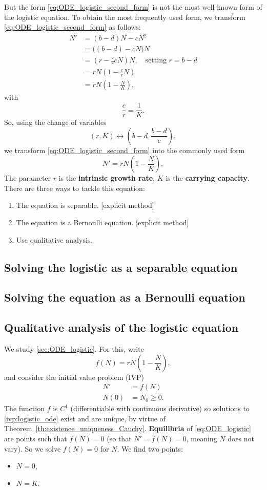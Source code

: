 But the form \eqref{eq:ODE_logistic_second_form} is not the most well known form of the logistic equation. To obtain the most frequently used form, we transform \eqref{eq:ODE_logistic_second_form} as follows:
\begin{align*}
N' &= (b-d)N-cN^2\\
&= \bigl((b-d)-cN\bigr)N \\
&= \left(r-\frac rr cN\right)N,\quad\textrm{setting }r=b-d \\
&= rN\left(1-\frac crN\right) \\
&= rN\left(1-\frac NK\right),
\end{align*}
with
\[
\frac cr=\frac 1K.
\]
So, using the change of variables 
\[
(r,K)\leftrightarrow\left(b-d,\frac{b-d}c\right),
\]
we transform \eqref{eq:ODE_logistic_second_form} into the commonly used form
\begin{equation}\label{eq:ODE_logistic}
N'=rN\left(1-\frac NK\right),
\end{equation}
The parameter $r$ is the \textbf{intrinsic growth rate}, $K$ is the \textbf{carrying capacity}.
There are three ways to tackle this equation:
\begin{enumerate}
\item The equation is separable. [explicit method]
\item The equation is a Bernoulli equation. [explicit method]
\item Use qualitative analysis.
\end{enumerate}

\subsection{Solving the logistic as a separable equation}
\subsection{Solving the equation as a Bernoulli equation}

\subsection{Qualitative analysis of the logistic equation}
We study \eqref{sec:ODE_logistic}.
For this, write
\[
f(N)=rN\left(1-\frac NK\right),
\]
and consider the initial value problem (IVP) 
\begin{equation}\label{ivp:logistic_ode}
\begin{aligned}
N' &= f(N)\\
N(0) &= N_0\geq 0.
\end{aligned}
\end{equation}
The function $f$ is $C^1$ (differentiable with continuous derivative) so solutions to \eqref{ivp:logistic_ode} exist and are unique, by virtue of Theorem~\ref{th:existence_uniqueness_Cauchy}.
\textbf{Equilibria} of \eqref{eq:ODE_logistic} are points such that $f(N)=0$ (so that $N'=f(N)=0$, meaning $N$ does not vary). So we solve $f(N)=0$ for $N$. We find two points:
\begin{itemize}
\item $N=0$,
\item $N=K$.
\end{itemize}

